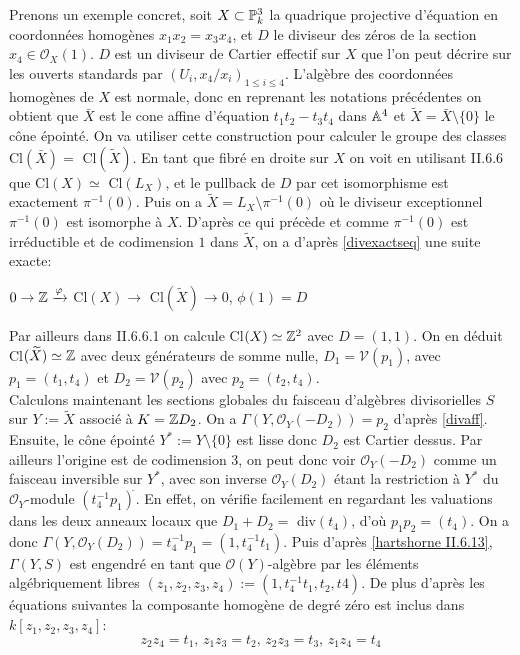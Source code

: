 Prenons un exemple concret, soit $X\subset \mathbb{P}^3_k$ la quadrique projective d'équation en coordonnées homogènes $x_1x_2=x_3x_4$, et $D$ le diviseur des zéros de la section $x_4\in\mathcal{O}_X(1)$. $D$ est un diviseur de Cartier effectif sur $X$ que l'on peut décrire sur les ouverts standards par $(U_i, x_4/x_i)_{1\leq i\leq 4}$. L'algèbre des coordonnées homogènes de $X$ est normale, donc en reprenant les notations précédentes on obtient que $\bar{X}$ est le cone affine d'équation $t_1t_2-t_3t_4$ dans $\mathbb{A}^4$ et $\widetilde{X}=\bar{X}\setminus\lbrace 0 \rbrace$ le cône épointé. On va utiliser cette construction pour calculer le groupe des classes Cl$(\bar{X})=$ Cl$(\widetilde{X})$. En tant que fibré en droite sur $X$ on voit en utilisant \cite{Hartshorne} II.6.6 que Cl$(X)\simeq$ Cl$(L_X)$, et le pullback de $D$ par cet isomorphisme est exactement $\pi^{-1}(0)$. Puis on a $\widetilde{X}=L_X \setminus \pi^{-1}(0)$ où le diviseur exceptionnel $\pi^{-1}(0)$ est isomorphe à $X$. D'après ce qui précède et comme $\pi^{-1}(0)$ est irréductible et de codimension $1$ dans $\widetilde{X}$, on a d'après \ref{divexactseq} une suite exacte:
\begin{center}
$ 0\rightarrow\mathbb{Z}\xrightarrow{\varphi}$ Cl$(X) \rightarrow$ Cl$(\widetilde{X}) \rightarrow 0$, $\phi(1)=D$
\end{center}
Par ailleurs dans \cite{Hartshorne} II.6.6.1 on calcule Cl$(X)\simeq \mathbb{Z}^2$ avec $D=(1,1)$. On en déduit Cl$(\widetilde{X})\simeq \mathbb{Z}$ avec deux générateurs de somme nulle, $D_1=\mathcal{V}(p_1)$, avec $p_1=(t_1,t_4)$ et $D_2=\mathcal{V}(p_2)$ avec $p_2=(t_2,t_4)$.\\ 
Calculons maintenant les sections globales du faisceau d'algèbres divisorielles $S$ sur $Y:=\widetilde{X}$ associé à $K=\mathbb{Z} D_2$. On a $\Gamma(Y, \mathcal{O}_Y(-D_2))=p_2$ d'après \ref{divaff}. Ensuite, le cône épointé $Y^*:=Y\setminus \lbrace 0 \rbrace$ est lisse donc $D_2$ est Cartier dessus. Par ailleurs l'origine est de codimension 3, on peut donc voir $\mathcal{O}_Y(-D_2)$ comme un faisceau inversible sur $Y^*$, avec son inverse $\mathcal{O}_Y(D_2)$ étant la restriction à $Y^*$ du $\mathcal{O}_Y$-module $(t_4^{-1}p_1)^{\widetilde{}}$. En effet, on vérifie facilement en regardant les valuations dans les deux anneaux locaux que $D_1+D_2=$ div$(t_4)$, d'où $p_1p_2=(t_4)$.  On a donc $\Gamma(Y, \mathcal{O}_Y(D_2))=t_4^{-1}p_1=(1, t_4^{-1}t_1)$. Puis d'après \ref{hartshorne II.6.13}, $\Gamma(Y,S)$ est engendré en tant que $\mathcal{O}(Y)$-algèbre par les éléments algébriquement libres $(z_1,z_2,z_3,z_4):=(1, t_4^{-1}t_1,t_2,t4)$. De plus d'après les équations suivantes la composante homogène de degré zéro est inclus dans $k[z_1,z_2,z_3,z_4]$:
$$ z_2z_4=t_1,\, z_1z_3=t_2,\, z_2z_3=t_3,\, z_1z_4=t_4$$

